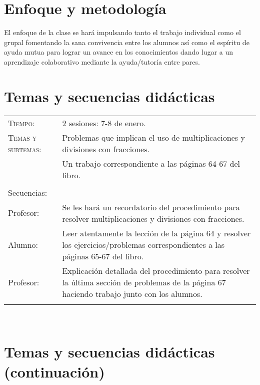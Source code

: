 \documentclass[letterpaper,10pt]{article}
\begin{document}
\vfill

\section{Enfoque y metodolog\'ia}

El enfoque de la clase se har\'a impulsando tanto el trabajo individual como el 
grupal fomentando la sana convivencia entre los alumnos as\'i como el esp\'iritu
de ayuda mutua para lograr un avance en los conocimientos dando lugar a un 
aprendizaje colaborativo mediante la ayuda/tutor\'ia entre pares.

\vfill

\section{Temas  y secuencias did\'acticas}
\begin{tabular}[t]{R{0.25\textwidth}p{0.71\textwidth}}
    \textsc{Tiempo:}                    & 2 sesiones: 7-8 de enero. \\
    \textsc{Temas y subtemas:}          & Problemas que implican el uso de multiplicaciones y divisiones con fracciones.\\
              & Un trabajo correspondiente a las 
    p\'aginas 64-67 del libro. \\ \\
    \large{\sc Secuencias:} \\
    Profesor:   & Se les har\'a un recordatorio del procedimiento para resolver 
    multiplicaciones y divisiones con fracciones. \\
    Alumno:     & Leer atentamente la lecci\'on de la p\'agina 64 y resolver los 
    ejercicios/problemas correspondientes a las p\'aginas 65-67 del libro. \\
    Profesor: & Explicación detallada del procedimiento para resolver la \'ultima
    secci\'on de problemas de la p\'agina 67 haciendo trabajo junto con los 
    alumnos. \\ \\
\hline
\end{tabular}
\\
\newpage
\section{Temas  y secuencias did\'acticas (continuaci\'on)}
\end{document}
